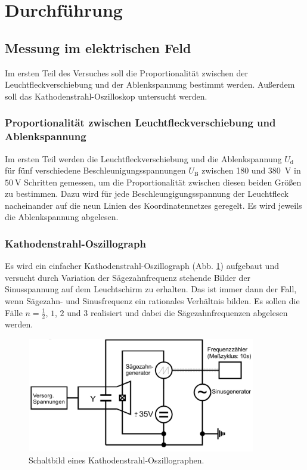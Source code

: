 \section{Durchführung}
\label{sec:Durchführung}

\subsection{Messung im elektrischen Feld}
Im ersten Teil des Versuches soll die Proportionalität zwischen
der Leuchtfleckverschiebung und der Ablenkspannung bestimmt werden.
Außerdem soll das Kathodenstrahl-Oszilloskop untersucht werden.

\subsubsection{Proportionalität zwischen Leuchtfleckverschiebung und Ablenkspannung}
Im ersten Teil werden die Leuchtfleckverschiebung und die 
Ablenkspannung $U_\text{d}$ für fünf verschiedene 
Beschleunigungsspannungen $U_\text{B}$ zwischen \num{180} und 
\SI{380}{\volt} in $\SI{50}{\volt}$ Schritten gemessen,
um die Proportionalität zwischen diesen beiden Größen zu
bestimmen. Dazu wird für jede Beschleungigungsspannung der
Leuchtfleck nacheinander auf die neun Linien des
Koordinatennetzes geregelt. Es wird jeweils die Ablenkspannung
abgelesen.

\subsubsection{Kathodenstrahl-Oszillograph}
Es wird ein einfacher Kathodenstrahl-Oszillograph (Abb. \ref{fig:oszillograph})
aufgebaut und versucht durch Variation der Sägezahnfrequenz 
stehende Bilder der Sinusspannung auf dem Leuchtschirm zu 
erhalten. Das ist immer dann der Fall, wenn Sägezahn- und 
Sinusfrequenz ein rationales Verhältnis bilden. Es sollen 
die Fälle $n = \frac{1}{2}$, $\num{1}$, $\num{2}$ und $\num{3}$ realisiert 
und dabei die Sägezahnfrequenzen abgelesen werden. 
\begin{figure}
    \centering
    \includegraphics[width=10cm, height=5cm]{build/V501_b.png}
    \caption{Schaltbild eines Kathodenstrahl-Oszillographen.}
    \label{fig:oszillograph}
\end{figure}

